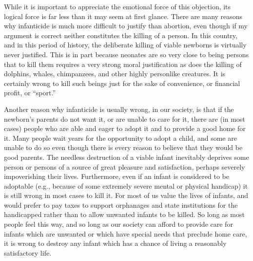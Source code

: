 While it is important to appreciate the emotional force of
this objection, its logical force is far less than it may seem
at first glance. There are many reasons why infanticide is
much more difficult to justify than abortion, even though
if my argument is correct neither constitutes the killing of
a person. In this country, and in this period of history, the
deliberate killing of viable newborns is virtually never
justified. This is in part because neonates are so very
close to being persons that to kill them requires a very
strong moral justification as does the killing of dolphins,
whales, chimpanzees, and other highly personlike
creatures. It is certainly wrong to kill such beings just for
the sake of convenience, or financial profit, or ``sport.”

Another reason why infanticide is usually wrong, in our
society, is that if the newborn’s parents do not want it, or
are unable to care for it, there are (in most cases) people
who are able and eager to adopt it and to provide a good
home for it. Many people wait years for the opportunity to
adopt a child, and some are unable to do so even though
there is every reason to believe that they would be good
parents. The needless destruction of a viable infant
inevitably deprives some person or persons of a source of
great pleasure and satisfaction, perhaps severely
impoverishing their lives. Furthermore, even if an infant
is considered to be adoptable (e.g., because of some
extremely severe mental or physical handicap) it is still
wrong in most cases to kill it. For most of us value the
lives of infants, and would prefer to pay taxes to support
orphanages and state institutions for the handicapped
rather than to allow unwanted infants to be killed. So long
as most people feel this way, and so long as our society
can afford to provide care for infants which are unwanted
or which have special needs that preclude home care, it is
wrong to destroy any infant which has a chance of living
a reasonably satisfactory life.

